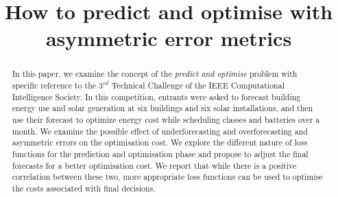 \documentclass[conference]{IEEEtran}
\begin{document}
\title{How to predict and optimise with asymmetric error metrics\\
}

\author{
\and
{}
}

\maketitle

\begin{abstract}
In this paper, we examine the concept of the {\it predict and optimise} problem with specific reference to the $3^{rd}$ Technical Challenge of the IEEE Computational Intelligence Society. In this competition, entrants were asked to forecast building energy use and solar generation at six buildings and six solar installations, and then use their forecast to optimize energy cost while scheduling classes and batteries over a month. We examine the possible effect of underforecasting and overforecasting and asymmetric errors on the optimisation cost. We explore the different nature of loss functions for the prediction and optimisation phase and propose to adjust the final forecasts for a better optimisation cost. We report that while there is a positive correlation between these two, more appropriate loss functions can be used to optimise the costs associated with final decisions. 
%

\end{abstract}
\end{document}
